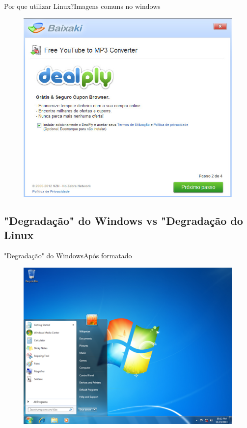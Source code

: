 \documentclass{beamer}
\begin{document}
\begin{frame}{Por que utilizar Linux?}{Imagens comuns no windows}
    \begin{figure}[h!]
        \centering
        \includegraphics[scale=0.3]{dealply.jpg}
    \end{figure}
\end{frame}

\subsection{"Degradação" do Windows vs "Degradação do Linux}
\begin{frame}{"Degradação" do Windows}{Após formatado}
    \begin{figure}[h!]
        \centering
        \includegraphics[scale=0.5]{Windows_7.png}
    \end{figure}
\end{frame}
\end{document}
